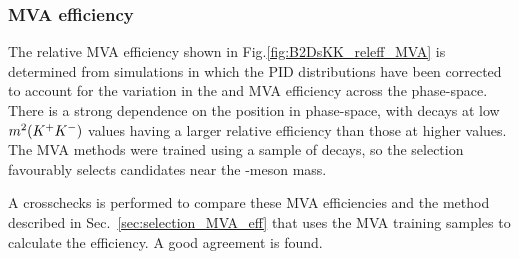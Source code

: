\subsubsection{MVA efficiency}

The relative MVA efficiency shown in Fig.\ref{fig:B2DsKK_releff_MVA} is determined from simulations in which the PID distributions have been corrected to account for the variation in the \Dsp and \phiz MVA efficiency across the phase-space. 
There is a strong dependence on the position in phase-space, with decays at low $m^{2}({{K}^+}{{K}^-})$ values having a larger relative efficiency than those at higher values. The MVA methods were trained using a sample of \decay{\phiz}{\Kp\Km} decays, so the selection favourably selects candidates near the \phiz-meson mass. 

A crosschecks is performed to compare these MVA efficiencies and the method described in Sec.~\ref{sec:selection_MVA_eff} that uses the MVA training samples to calculate the efficiency. A good agreement is found.







